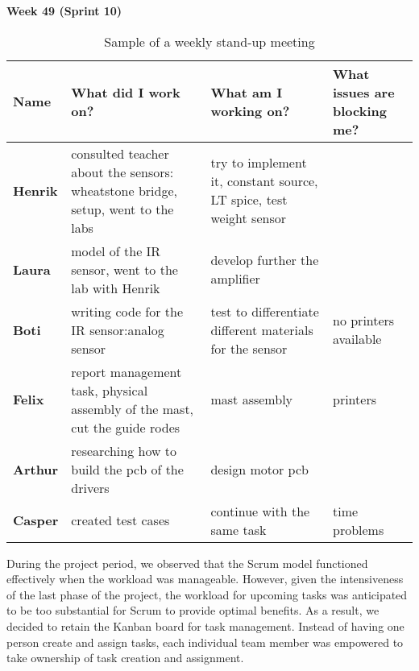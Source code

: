 \documentclass[../report.tex]{subfiles}
\begin{document}
\textbf{Week 49 (Sprint 10)}
\begin{table}[H]
    \begin{center}
        \begin{tabularx}{\linewidth}{L|L|L|L}
            
            \textbf{Name} & \textbf{What did I work on?} & \textbf{What am I working on? }& \textbf{What issues are blocking me?} \\
            \hline
            \textbf{Henrik} & consulted teacher about the sensors: wheatstone bridge, setup, went to the labs & try to implement it, constant source, LT spice, test weight sensor &  \\
            \hline
            \textbf{Laura} & model of the IR sensor, went to the lab with Henrik & develop further the amplifier  & \\
            \hline
            \textbf{Boti} & writing code for the IR sensor:analog sensor & test to differentiate different materials for the sensor & no printers available\\
            \hline
            \textbf{Felix} & report management task, physical assembly of the mast, cut the guide rodes & mast assembly & printers \\
            \hline
            \textbf{Arthur} & researching how to build the pcb of the drivers & design motor pcb & \\
            \hline
            \textbf{Casper} & created test cases & continue with the same task & time problems
        \end{tabularx}
    \end{center}
    \caption{Sample of a weekly stand-up meeting}
\end{table}

During the project period, we observed that the Scrum model functioned
effectively when the workload was manageable. However, given the intensiveness
of the last phase of the project, the workload for upcoming tasks was
anticipated to be too substantial for Scrum to provide optimal benefits. As a
result, we decided to retain the Kanban board for task management. Instead of
having one person create and assign tasks, each individual team member was
empowered to take ownership of task creation and assignment.
\end{document}
